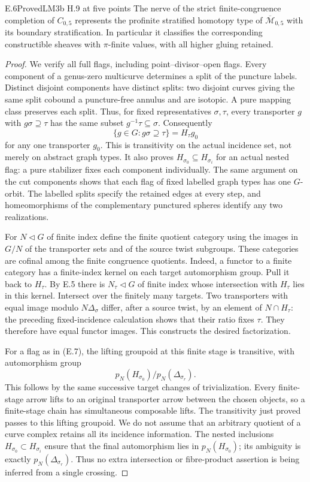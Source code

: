 \begin{result}{E.6}{Proved}{LM3b H.9 at five points}
The nerve of the strict finite-congruence completion of $C_{0,5}$
represents the profinite stratified homotopy type of
$\overline{\mathcal M}_{0,5}$ with its boundary stratification.
In particular it classifies the corresponding constructible sheaves
with $\pi$-finite values, with all higher gluing retained.
\end{result}
\begin{proof}
We verify all full flags, including point--divisor--open flags.
Every component of a genus-zero multicurve determines a split of
the puncture labels.  Distinct disjoint components have distinct
splits: two disjoint curves giving the same split cobound a
puncture-free annulus and are isotopic.  A pure mapping class
preserves each split.  Thus, for fixed representatives $\sigma,\tau$,
every transporter $g$ with $g\sigma\supseteq\tau$ has the same
subset $g^{-1}\tau\subseteq\sigma$.  Consequently
\[
 \{g\in G:g\sigma\supseteq\tau\}=H_\tau g_0
\]
for any one transporter $g_0$.  This is transitivity on the actual
incidence set, not merely on abstract graph types.  It also proves
$H_{\sigma_0}\subseteq H_{\sigma_i}$ for an actual nested flag:
a pure stabilizer fixes each component individually.  The same
argument on the cut components shows that each flag of fixed
labelled graph types has one $G$-orbit.  The labelled splits specify
the retained edges at every step, and homeomorphisms of the
complementary punctured spheres identify any two realizations.

For $N\lhd G$ of finite index define the finite quotient category
using the images in $G/N$ of the transporter sets and of the source
twist subgroups.  These categories are cofinal among the finite
congruence quotients.  Indeed, a functor to a finite category has a
finite-index kernel on each target automorphism group.  Pull it back
to $H_\tau$.  By E.5 there is $N_\tau\lhd G$ of finite index whose
intersection with $H_\tau$ lies in this kernel.  Intersect over the
finitely many targets.  Two transporters with equal image modulo
$N\Delta_\sigma$ differ, after a source twist, by an element of
$N\cap H_\tau$: the preceding fixed-incidence calculation shows
that their ratio fixes $\tau$.  They therefore have equal functor
images.  This
constructs the desired factorization.

For a flag as in (E.7), the lifting groupoid at this finite stage is
transitive, with automorphism group
\[
 p_N(H_{\sigma_0})/p_N(\Delta_{\sigma_r}).                    \tag{E.8}
\]
This follows by the same successive target changes of trivialization.
Every finite-stage arrow lifts to an original transporter arrow
between the chosen objects, so a finite-stage chain has simultaneous
composable lifts.  The transitivity just proved passes to this
lifting groupoid.  We do not assume that an arbitrary quotient of
a curve complex retains all its incidence information.
The nested inclusions $H_{\sigma_0}\subset H_{\sigma_i}$ ensure that
the final automorphism lies in $p_N(H_{\sigma_0})$; its ambiguity is
exactly $p_N(\Delta_{\sigma_r})$.  Thus no extra intersection or
fibre-product assertion is being inferred from a single crossing.


\end{proof}
